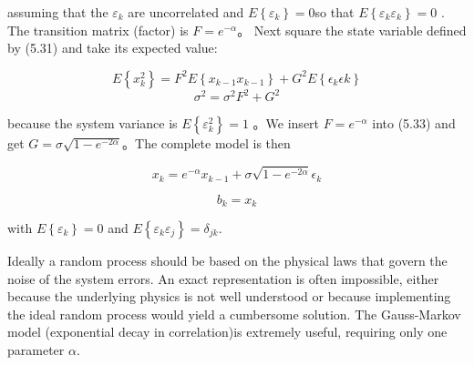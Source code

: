 assuming that the $ \varepsilon_{k} $ are uncorrelated and $ E\left\lbrace \varepsilon_{k}\right\rbrace =0 $so that $ E\left\lbrace \varepsilon_{k}\varepsilon_{k} \right\rbrace = 0 $ . The transition matrix (factor) is $ F=e^{-\alpha} $。 Next square the state variable defined by (5.31) and take its expected value: 

\[ E\left\lbrace x_{k}^{2}\right\rbrace = F^{2}E\left\lbrace x_{k-1}x_{k-1}\right\rbrace+G^{2}E\left\lbrace \epsilon_{k}\epsilon{k}\right\rbrace \]
\begin{equation}\label{5.33}
\sigma^{2}=\sigma^{2}F^{2}+G^{2}
\end{equation}
 

because the system variance is $ E\left\lbrace\varepsilon_{k}^{2}\right\rbrace=1 $ 。We insert $ F=e^{-\alpha} $ into (5.33) and get $ G=\sigma\sqrt{1-e^{-2\alpha}}   $。The complete model is then

 \[ x_{k}=e^{-\alpha}x_{k-1}+\sigma\sqrt{1-e^{-2\alpha}}\epsilon_{k} \]
 
 \[ b_{k}=x_{k} \]
 
  with $ E\left\lbrace \varepsilon_{k}\right\rbrace=0  $ and $E\left\lbrace \varepsilon_{k}\varepsilon_{j}\right\rbrace=\delta_{jk}$.
 
 Ideally a random process should be based on the physical laws that govern the noise of the system errors. An exact representation is often impossible, either because the underlying physics is not well understood or because implementing the ideal random process would yield a cumbersome solution. The Gauss-Markov model (exponential decay in correlation)is extremely useful, requiring only one parameter $ \alpha $. 



	
	
	
	
	
	
 
	
	
	
	
	
	
	
	